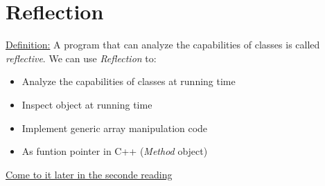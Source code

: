 \documentclass[12pt]{article}
\begin{document}
\section{Reflection}
\underline{Definition:} A program that can analyze the capabilities of classes is called \emph{reflective}.\newline
We can use \emph{Reflection} to:
\begin{itemize}
    \item Analyze the capabilities of classes at running time
    \item Inspect object at running time
    \item Implement generic array manipulation code
    \item As funtion pointer in C++ (\emph{Method} object)
\end{itemize}

\underline{Come to it later in the seconde reading}
\end{document}
